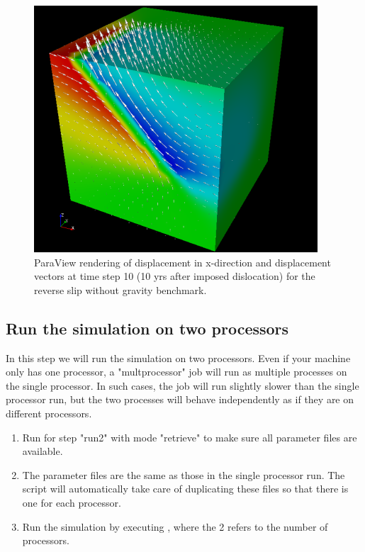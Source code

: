\begin{enumerate}
  \begin{figure}[htbp]
    \begin{center}
      \includegraphics{figs/xdisp_vec_t10}
      \caption{ParaView rendering of displacement in x-direction and
        displacement vectors at time step 10 (10 yrs after imposed
        dislocation) for the reverse slip without gravity
        benchmark.}
      \label{fig:bmrsnog:xdisp:vec:t10}
    \end{center}
  \end{figure}      

\end{enumerate}

\subsection{Run the simulation on two processors}

In this step we will run the simulation on two processors. Even if
your machine only has one processor, a "multprocessor" job will run as
multiple processes on the single processor. In such cases, the job
will run slightly slower than the single processor run, but the two
processes will behave independently as if they are on different
processors.

\begin{enumerate}
\item Run  for step "run2" with mode "retrieve" to
  make sure all parameter files are available.

  \begin{screen}
    \shellprompt{}
  \end{screen}
  
\item The parameter files are the same as those in the single
  processor run. The  script will automatically take
  care of duplicating these files so that there is one for each
  processor.
\item Run the simulation by executing , where
  the 2 refers to the number of processors.

  \begin{screen}
    \shellprompt{}
  \end{screen}
\end{enumerate}

